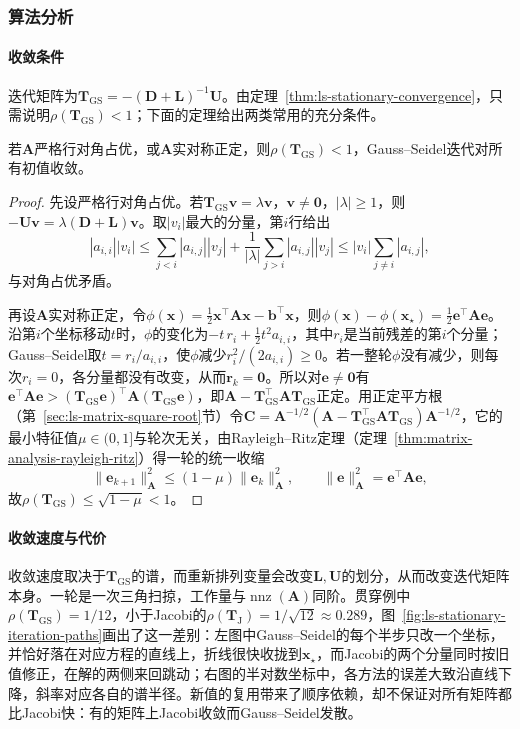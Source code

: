 \subsubsection{算法分析}

\paragraph{收敛条件}
迭代矩阵为$\bm T_{\mathrm{GS}}=-(\bm D+\bm L)^{-1}\bm U$。由定理~\ref{thm:ls-stationary-convergence}，只需说明$\rho(\bm T_{\mathrm{GS}})<1$；下面的定理给出两类常用的充分条件。
\begin{theorem}
\label{thm:ls-gauss-seidel-convergence}
若$\bm A$严格行对角占优，或$\bm A$实对称正定，则$\rho(\bm T_{\mathrm{GS}})<1$，Gauss--Seidel迭代对所有初值收敛。
\end{theorem}
\begin{proof}
先设严格行对角占优。若$\bm T_{\mathrm{GS}}\bm v=\lambda\bm v$，$\bm v\neq\bm 0$，$|\lambda|\geq1$，则$-\bm U\bm v=\lambda(\bm D+\bm L)\bm v$。取$|v_i|$最大的分量，第$i$行给出
\[
|a_{i,i}||v_i|\leq\sum_{j<i}|a_{i,j}||v_j|+\frac{1}{|\lambda|}\sum_{j>i}|a_{i,j}||v_j|
\leq|v_i|\sum_{j\neq i}|a_{i,j}|,
\]
与对角占优矛盾。

再设$\bm A$实对称正定，令$\phi(\bm x)=\tfrac12\bm x^\top\bm A\bm x-\bm b^\top\bm x$，则$\phi(\bm x)-\phi(\bm x_\star)=\tfrac12\bm e^\top\bm A\bm e$。沿第$i$个坐标移动$t$时，$\phi$的变化为$-t\,r_i+\tfrac12t^2a_{i,i}$，其中$r_i$是当前残差的第$i$个分量；Gauss--Seidel取$t=r_i/a_{i,i}$，使$\phi$减少$r_i^2/(2a_{i,i})\geq0$。若一整轮$\phi$没有减少，则每次$r_i=0$，各分量都没有改变，从而$\bm r_k=\bm 0$。所以对$\bm e\neq\bm 0$有$\bm e^\top\bm A\bm e>(\bm T_{\mathrm{GS}}\bm e)^\top\bm A(\bm T_{\mathrm{GS}}\bm e)$，即$\bm A-\bm T_{\mathrm{GS}}^\top\bm A\bm T_{\mathrm{GS}}$正定。用正定平方根（第~\ref{sec:ls-matrix-square-root}节）令$\bm C=\bm A^{-1/2}(\bm A-\bm T_{\mathrm{GS}}^\top\bm A\bm T_{\mathrm{GS}})\bm A^{-1/2}$，它的最小特征值$\mu\in(0,1]$与轮次无关，由Rayleigh--Ritz定理（定理~\ref{thm:matrix-analysis-rayleigh-ritz}）得一轮的统一收缩
\[
\lVert\bm e_{k+1}\rVert_{\bm A}^2\leq(1-\mu)\lVert\bm e_k\rVert_{\bm A}^2,\qquad
\lVert\bm e\rVert_{\bm A}^2=\bm e^\top\bm A\bm e ,
\]
故$\rho(\bm T_{\mathrm{GS}})\leq\sqrt{1-\mu}<1$。
\end{proof}
\paragraph{收敛速度与代价}
收敛速度取决于$\bm T_{\mathrm{GS}}$的谱，而重新排列变量会改变$\bm L,\bm U$的划分，从而改变迭代矩阵本身。一轮是一次三角扫掠，工作量与$\operatorname{nnz}(\bm A)$同阶。贯穿例中$\rho(\bm T_{\mathrm{GS}})=1/12$，小于Jacobi的$\rho(\bm T_{\mathrm J})=1/\sqrt{12}\approx0.289$，图~\ref{fig:ls-stationary-iteration-paths}画出了这一差别：左图中Gauss--Seidel的每个半步只改一个坐标，并恰好落在对应方程的直线上，折线很快收拢到$\bm x_\star$，而Jacobi的两个分量同时按旧值修正，在解的两侧来回跳动；右图的半对数坐标中，各方法的误差大致沿直线下降，斜率对应各自的谱半径。新值的复用带来了顺序依赖，却不保证对所有矩阵都比Jacobi快：有的矩阵上Jacobi收敛而Gauss--Seidel发散。

